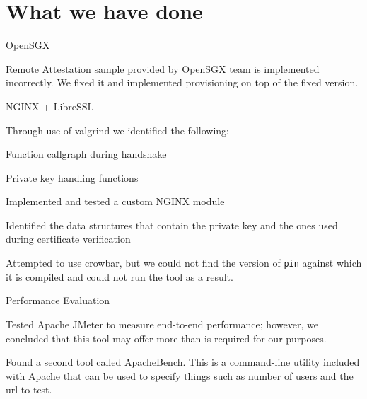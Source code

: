 \documentclass[11pt,agenda]{meetingmins}
\begin{document}
	\maketitle
	\section{What we have done}
		\begin{items}
			\item OpenSGX
			\begin{items}
				\item Remote Attestation sample provided by OpenSGX team is implemented incorrectly. We fixed it and implemented provisioning on top of the fixed version.
			\end{items}
			\item NGINX + LibreSSL
			\begin{items}
			\item Through use of valgrind we identified the following:
				\begin{items}
					\item Function callgraph during handshake 
					\item Private key handling functions
				\end{items}
			\item Implemented and tested a custom NGINX module 
			\item Identified the data structures that contain the private key and the ones used during certificate verification
			\item Attempted to use crowbar, but we could not find the version of \texttt{pin} against which it is compiled and could not run the tool as a result.
			\end{items}
			\item Performance Evaluation
			\begin{items}
				\item Tested Apache JMeter to measure end-to-end performance; however, we concluded that this tool may offer more than is required for our purposes.
				\item Found a second tool called ApacheBench. This is a command-line utility included with Apache that can be used to specify things such as number of users
				and the url to test.
			\end{items}
		\end{items}
\end{document}
